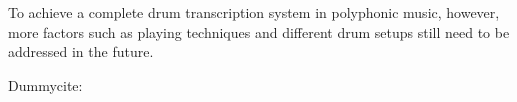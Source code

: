\documentclass{article}
\begin{document}
To achieve a complete drum transcription system in polyphonic music, however, more factors such as playing techniques and different drum setups still need to be addressed in the future. 

Dummycite: \cite{tzanetakis_musical_2002}

%
%
%
%
%
%
%

%
%
%
%
%
%


\end{document}
